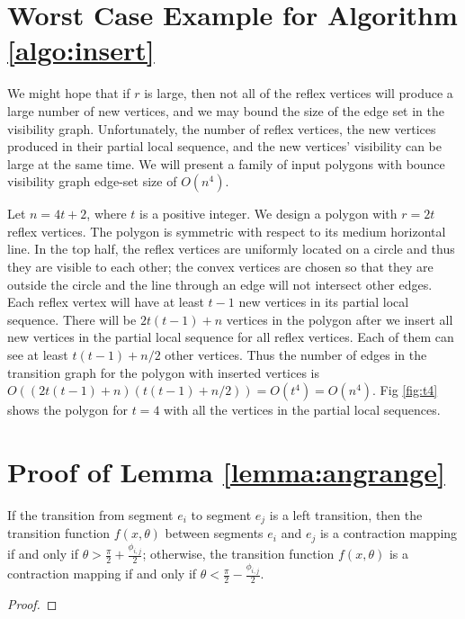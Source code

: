 \documentclass[]{styles/svproc}  %
\begin{document}
\begin{appendix}

\section{Worst Case Example for Algorithm \ref{algo:insert}}

We might hope that if $r$ is large, then not all of the reflex vertices will
produce a large number of new vertices, and we may bound the size of the edge
set in the visibility graph. Unfortunately, the number of reflex
vertices, the new vertices produced in their partial local sequence, and the new
vertices' visibility can be large at the same time. We will present a family of
input polygons with bounce visibility graph edge-set size of $O(n^4)$.

Let $n = 4t+2$, where $t$ is a positive integer. We design a polygon with
$r = 2t$ reflex vertices. The polygon is symmetric with respect to its medium
horizontal line. In the top half, the reflex vertices are uniformly located on a
circle and thus they are visible to each other; the convex vertices are chosen
so that they are outside the circle and the line through an edge will not
intersect other edges. Each reflex vertex will have at least $t-1$ new
vertices in its partial local sequence. There will be $2t(t-1)+n$
vertices in the polygon after we insert all new vertices in the partial local
sequence for all reflex vertices. Each of them can see at least $t(t-1)+n/2$
other vertices. Thus the number of edges in the transition graph for the
polygon with inserted vertices is
$O ((2t(t-1)+n)(t(t-1)+n/2)) = O(t^4) = O(n^4)$.
Fig \ref{fig:t4} shows the polygon for $t = 4$ with all the
vertices in the partial local sequences. %

\section{Proof of Lemma \ref{lemma:angrange}}

\begin{lemma}
If the transition from segment $e_i$ to segment $e_j$ is a left transition, then the
transition function $f(x, \theta)$ between segments $e_i$ and $e_j$ is a contraction
mapping if and only if $\theta > \frac{\pi}{2}+\frac{\phi_{i, j}}{2}$;
otherwise, the transition function $f(x, \theta)$ is a contraction mapping if
and only if $\theta < \frac{\pi}{2}-\frac{\phi_{i, j}}{2}$.
\end{lemma}
\begin{proof}


\end{proof}
\end{appendix}
\end{document}
